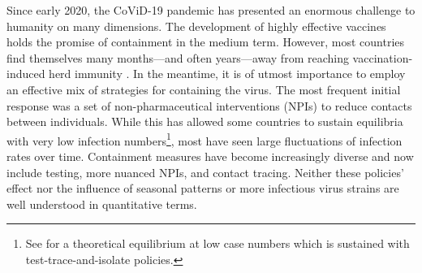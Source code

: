 


Since early 2020, the CoViD-19 pandemic has presented an enormous challenge to humanity
on many dimensions. The development of highly effective vaccines holds the promise of
containment in the medium term. However, most countries find themselves many
months---and often years---away from reaching vaccination-induced herd immunity
\citep{Swaminathan2021}. In the meantime, it is of utmost importance to employ an effective
mix of strategies for containing the virus. The most frequent initial response was a set
of non-pharmaceutical interventions (NPIs) to reduce contacts between individuals. While
this has allowed some countries to sustain equilibria with very low infection
numbers\footnote{See \citet{Contreras2021} for a theoretical equilibrium at low case
numbers which is sustained with test-trace-and-isolate policies.}, most have seen large
fluctuations of infection rates over time. Containment measures have become increasingly
diverse and now include testing, more nuanced NPIs, and contact tracing. Neither these
policies' effect nor the influence of seasonal patterns or more infectious virus strains
are well understood in quantitative terms.

